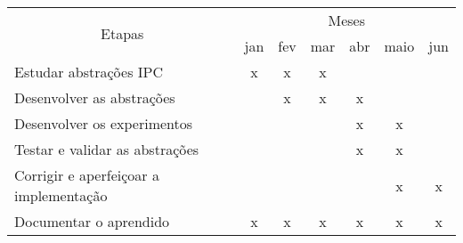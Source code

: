 \documentclass[12pt]{article}
\begin{document}
\begin{tabularx}{\linewidth}{|X|*{6}{c|}}
  \hline
  \multicolumn{1}{|c|}{\multirow{2}{*}{Etapas}} & \multicolumn{6}{|c|}{Meses}\\ \cline{2-7}
  & jan & fev & mar & abr & maio & jun \\ \hline

  Estudar abstrações IPC
  &  x  &  x  &  x  &     &     &     \\ \hline

  Desenvolver as abstrações
  &     &  x  &  x  &  x  &     &     \\ \hline

  Desenvolver os experimentos
  &     &     &     &  x  &  x  &     \\ \hline

  Testar e validar as abstrações
  &     &     &     &  x  &  x  &     \\ \hline

  Corrigir e aperfeiçoar a implementação
  &     &     &     &     &  x  &  x  \\ \hline

  Documentar o aprendido
  &  x  &  x  &  x  &  x  &  x  &  x  \\ \hline

\end{tabularx}



\end{document}
